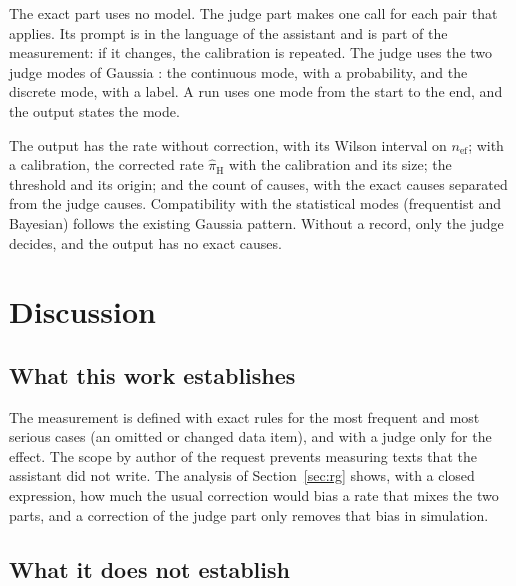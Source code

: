 \documentclass[11pt,a4paper]{article}
\begin{document}
The exact part uses no model. The judge part makes one call for each pair that applies. Its prompt is in the
language of the assistant and is part of the measurement: if it changes, the calibration is repeated. The judge
uses the two judge modes of Gaussia \cite{gaussia2026}: the continuous mode, with a probability, and the
discrete mode, with a label. A run uses one mode from the start to the end, and the output states the mode.

The output has the rate without correction, with its Wilson interval on $n_{\mathrm{ef}}$; with a calibration,
the corrected rate $\hat{\pi}_{\mathrm{H}}$ with the calibration and its size; the threshold and its origin; and
the count of causes, with the exact causes separated from the judge causes. Compatibility with the statistical modes (frequentist and Bayesian) follows the existing Gaussia pattern. Without a
record, only the judge decides, and the output has no exact causes.

\section{Discussion}

\subsection{What this work establishes}

The measurement is defined with exact rules for the most frequent and most serious cases (an omitted or changed
data item), and with a judge only for the effect. The scope by author of the request prevents measuring texts that
the assistant did not write. The analysis of Section~\ref{sec:rg} shows, with a closed expression, how much the
usual correction would bias a rate that mixes the two parts, and a correction of the judge part only removes
that bias in simulation.

\subsection{What it does not establish}
\end{document}
